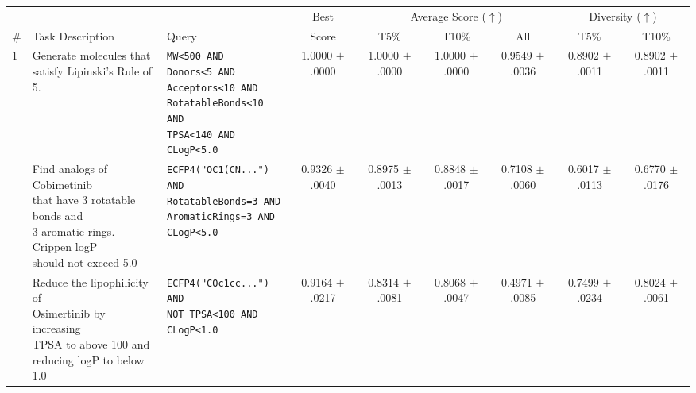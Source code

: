 \begin{tabular}{lll cccccc}
\toprule
 & & & Best & \multicolumn{3}{c}{Average Score ($\uparrow$)} & \multicolumn{2}{c}{Diversity ($\uparrow$)}\\
 \# & Task Description & Query & Score & T5\% & T10\% & All & T5\% & T10\% \\
\midrule
1 & \makecell[l]{Generate molecules that \\ satisfy Lipinski's Rule of 5.} & \makecell[l]{\tt MW<500 AND \\ \tt Donors<5 AND \\ \tt Acceptors<10 AND \\ \tt RotatableBonds<10 AND \\ \tt TPSA<140 AND CLogP<5.0} & \makecell{1.0000 \\ $\pm$.0000} & \makecell{1.0000 \\ $\pm$.0000} & \makecell{1.0000 \\ $\pm$.0000} & \makecell{0.9549 \\ $\pm$.0036} & \makecell{0.8902 \\ $\pm$.0011} & \makecell{0.8902 \\ $\pm$.0011}\\
\addlinespace[0.5em]
2 & \makecell[l]{Find analogs of Cobimetinib \\ that have 3 rotatable bonds and \\ 3 aromatic rings. Crippen logP \\ should not exceed 5.0} & \makecell[l]{\tt ECFP4("OC1(CN...") AND \\ \tt RotatableBonds=3 AND \\ \tt AromaticRings=3 AND  \\ \tt CLogP<5.0} & \makecell{0.9326 \\ $\pm$.0040} & \makecell{0.8975 \\ $\pm$.0013} & \makecell{0.8848 \\ $\pm$.0017} & \makecell{0.7108 \\ $\pm$.0060} & \makecell{0.6017 \\ $\pm$.0113} & \makecell{0.6770 \\ $\pm$.0176} \\
\addlinespace[0.5em]
3 & \makecell[l]{Reduce the lipophilicity of \\ Osimertinib by increasing \\ TPSA to above 100 and \\ reducing logP to below 1.0} & \makecell[l]{\tt ECFP4("COc1cc...") AND \\ \tt NOT TPSA<100 AND \\ \tt CLogP<1.0} & \makecell{0.9164 \\ $\pm$.0217} & \makecell{0.8314 \\ $\pm$.0081} & \makecell{0.8068 \\ $\pm$.0047} & \makecell{0.4971 \\ $\pm$.0085} & \makecell{0.7499 \\ $\pm$.0234} & \makecell{0.8024 \\ $\pm$.0061} \\
\bottomrule
\end{tabular}